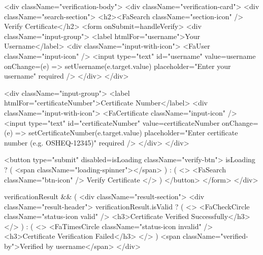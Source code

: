 {{      <div className="verification-body">
        <div className="verification-card">
          <div className="search-section">
            <h2><FaSearch className="section-icon" /> Verify Certificate</h2>
            <form onSubmit={handleVerify}>
              <div className="input-group">
                <label htmlFor="username">Your Username</label>
                <div className="input-with-icon">
                  <FaUser className="input-icon" />
                  <input
                    type="text"
                    id="username"
                    value={username}
                    onChange={(e) => setUsername(e.target.value)}
                    placeholder="Enter your username"
                    required
                  />
                </div>
              </div>

              <div className="input-group">
                <label htmlFor="certificateNumber">Certificate Number</label>
                <div className="input-with-icon">
                  <FaCertificate className="input-icon" />
                  <input
                    type="text"
                    id="certificateNumber"
                    value={certificateNumber}
                    onChange={(e) => setCertificateNumber(e.target.value)}
                    placeholder="Enter certificate number (e.g. OSHEQ-12345)"
                    required
                  />
                </div>
              </div>

              <button type="submit" disabled={isLoading} className="verify-btn">
                {isLoading ? (
                  <span className="loading-spinner"></span>
                ) : (
                  <>
                    <FaSearch className="btn-icon" />
                    Verify Certificate
                  </>
                )}
              </button>
            </form>
          </div>

          {verificationResult && (
            <div className="result-section">
              <div className="result-header">
                {verificationResult.isValid ? (
                  <>
                    <FaCheckCircle className="status-icon valid" />
                    <h3>Certificate Verified Successfully</h3>
                  </>
                ) : (
                  <>
                    <FaTimesCircle className="status-icon invalid" />
                    <h3>Certificate Verification Failed</h3>
                  </>
                )}
                <span className="verified-by">Verified by {username}</span>
              </div>

}}}
